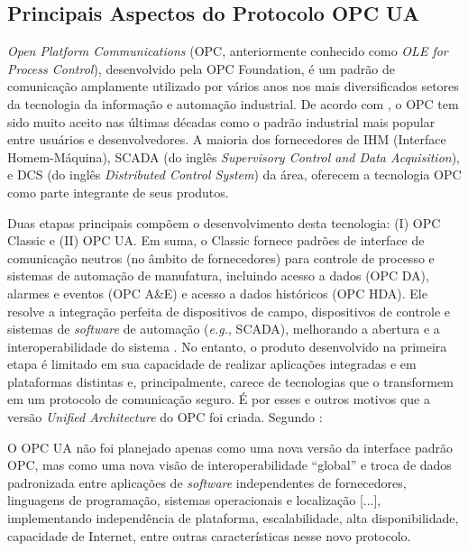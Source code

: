     \subsection{Principais Aspectos do Protocolo OPC UA} \label{subsec:opcUA}

        \textit{Open Platform Communications} (OPC, anteriormente conhecido como \textit{OLE for Process Control}), desenvolvido pela OPC Foundation, é um padrão de comunicação amplamente utilizado por vários anos nos mais diversificados setores da tecnologia da informação e automação industrial. De acordo com , o OPC tem sido muito aceito nas últimas décadas como o padrão industrial mais popular entre usuários e desenvolvedores. A maioria dos fornecedores de IHM (Interface Homem-Máquina), SCADA (do inglês \textit{Supervisory Control and Data Acquisition}), e DCS (do inglês \textit{Distributed Control System}) da área, oferecem a tecnologia OPC como parte integrante de seus produtos.

        Duas etapas principais compõem o desenvolvimento desta tecnologia: (I) OPC Classic e (II) OPC UA. Em suma, o Classic fornece padrões de interface de comunicação neutros (no âmbito de fornecedores) para controle de processo e sistemas de automação de manufatura, incluindo acesso a dados (OPC DA), alarmes e eventos (OPC A\&E) e acesso a dados históricos (OPC HDA). Ele resolve a integração perfeita de dispositivos de campo, dispositivos de controle e sistemas de \textit{software} de automação (\textit{e.g.}, SCADA), melhorando a abertura e a interoperabilidade do sistema \cite{han2022}. No entanto, o produto desenvolvido na primeira etapa é limitado em sua capacidade de realizar aplicações integradas e em plataformas distintas e, principalmente, carece de tecnologias que o transformem em um protocolo de comunicação seguro. É por esses e outros motivos que a versão \textit{Unified Architecture} do OPC foi criada. Segundo :
        
        \begin{citacao}
            O OPC UA não foi planejado apenas como uma nova versão da interface padrão OPC, mas como uma nova visão de interoperabilidade ``global'' e troca de dados padronizada entre aplicações de \textit{software} independentes de fornecedores, linguagens de programação, sistemas operacionais e localização [...], implementando independência de plataforma, escalabilidade, alta disponibilidade, capacidade de Internet, entre outras características nesse novo protocolo.
        \end{citacao}
        
